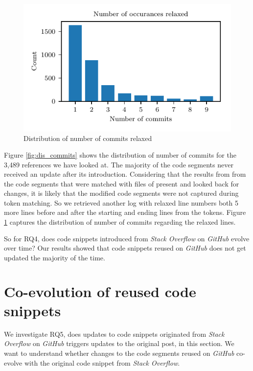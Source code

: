 \documentclass[sigconf]{acmart}
\begin{document}
\begin{figure}[h]
\centering
\includegraphics[width=\linewidth]{Figure_4.pdf}
\caption{Distribution of number of commits relaxed}
\label{fig:dis_commits_r}
\end{figure}


Figure \ref{fig:dis_commits} shows the distribution of number of commits for the 3,489 references we have looked at. The majority of the code segments never received an update after its introduction. Considering that the results from from the code segments that were matched with files of present and looked back for changes, it is likely that the modified code segments were not captured during token matching. So we retrieved another log with relaxed line numbers both 5 more lines before and after the starting and ending lines from the tokens. Figure \ref{fig:dis_commits_r} captures the distribution of number of commits regarding the relaxed lines.


So for RQ4, does code snippets introduced from \textit{Stack Overflow} on \textit{GitHub} evolve over time? Our results showed that code snippets reused on \textit{GitHub} does not get updated the majority of the time.


\section{Co-evolution of reused code snippets}

We investigate RQ5, does updates to code snippets originated from \textit{Stack Overflow} on \textit{GitHub} triggers updates to the original post, in this section. We want to understand whether changes to the code segments reused on \textit{GitHub} co-evolve with the original code snippet from \textit{Stack Overflow}.
\end{document}
